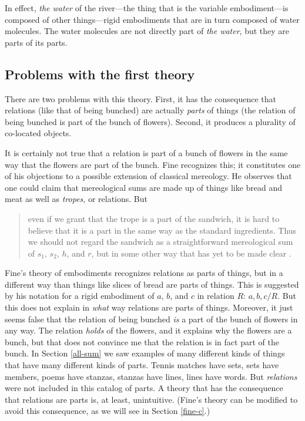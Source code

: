 \documentclass[12pt,twoside]{reedfancy}
\begin{document}
\begin{spacing}{1.25}
In effect, {\em the water} of the river---the thing that is the
variable embodiment---is composed of other things---rigid embodiments
that are in turn composed of water molecules.  The water molecules are
not directly part of {\em the water}, but they are parts of its parts.

\subsection{Problems with the first theory}
\label{problems1}
There are two problems with this theory.  First, it has the
consequence that relations (like that of being bunched) are actually
{\em parts} of things (the relation of being bunched is part of the
bunch of flowers).  Second, it produces a plurality of co-located
objects.

It is certainly not true that a relation is part of a bunch of flowers
in the same way that the flowers are part of the bunch.  Fine
recognizes this; it constitutes one of his objections to a possible
extension of classical mereology.  He observes that one could claim
that mereological sums are made up of things like bread and meat as
well as {\em tropes}, or relations.  But

\begin{quote}
even if we grant that the trope is a part of the sandwich, it is hard
to believe that it is a part in the same way as the standard
ingredients.  Thus we should not regard the sandwich as a
straightforward mereological sum of $s_1$, $s_2$, $h$, and $r$, but in
some other way that has yet to be made clear \citep[64]{fine1999}.
\end{quote}

Fine's theory of embodiments recognizes relations as parts of things,
but in a different way than things like slices of bread are parts of
things.  This is suggested by his notation for a rigid embodiment of
$a$, $b$, and $c$ in relation $R$: $a, b, c / R$.  But this does not
explain in {\em what} way relations are parts of things.  Moreover, it
just seems false that the relation of being bunched {\em is} a part of
the bunch of flowers in any way.  The relation {\em holds} of the
flowers, and it explains why the flowers are a bunch, but that does
not convince me that the relation is in fact part of the bunch.  In
Section \ref{all-sum} we saw examples of many different kinds of
things that have many different kinds of parts.  Tennis matches have
sets, sets have members, poems have stanzas, stanzas have lines, lines
have words.  But {\em relations} were not included in this catalog of
parts.  A theory that has the consequence that relations are parts is,
at least, unintuitive.  (Fine's theory can be modified to avoid this
consequence, as we will see in Section \ref{fine-c}.)


\end{spacing}
\end{document}
